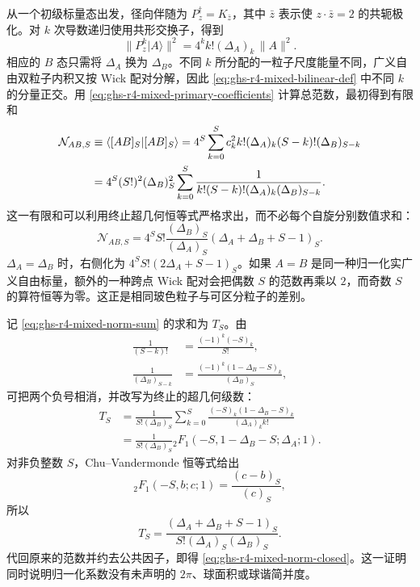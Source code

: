 从一个初级标量态出发，径向伴随为 $P_z^\dagger=K_{\bar z}$，其中 $\bar z$ 表示使 $z\cdot\bar z=2$ 的共轭极化。对 $k$ 次导数递归使用共形交换子，得到
\begin{equation}\label{eq:ghs-r4-oneparticle-highest-norm}
 \|P_z^k|A\rangle\|^2
 =4^k k!(\Delta_A)_k\,\|A\|^2.
\end{equation}
相应的 $B$ 态只需将 $\Delta_A$ 换为 $\Delta_B$。不同 $k$ 所分配的一粒子尺度能量不同，广义自由双粒子内积又按 Wick 配对分解，因此 \cref{eq:ghs-r4-mixed-bilinear-def} 中不同 $k$ 的分量正交。用 \cref{eq:ghs-r4-mixed-primary-coefficients} 计算总范数，最初得到有限和
\begin{align}\label{eq:ghs-r4-mixed-norm-sum}
 \mathcal N_{AB,S}&\equiv\langle[AB]_S|[AB]_S\rangle
 =4^S\sum_{k=0}^S c_k^2
 k!(\Delta_A)_k(S-k)!(\Delta_B)_{S-k}\\
 &=4^S(S!)^2(\Delta_B)_S^2
 \sum_{k=0}^S\frac{1}{k!(S-k)!(\Delta_A)_k(\Delta_B)_{S-k}}.
 \notag
\end{align}
这一有限和可以利用终止超几何恒等式严格求出，而不必每个自旋分别数值求和：
\begin{equation}\label{eq:ghs-r4-mixed-norm-closed}
 \mathcal N_{AB,S}=4^S S!\frac{(\Delta_B)_S}{(\Delta_A)_S}
 (\Delta_A+\Delta_B+S-1)_S.
\end{equation}
$\Delta_A=\Delta_B$ 时，右侧化为 $4^S S!(2\Delta_A+S-1)_S$。如果 $A=B$ 是同一种归一化实广义自由标量，额外的一种跨点 Wick 配对会把偶数 $S$ 的范数再乘以 $2$，而奇数 $S$ 的算符恒等为零。这正是相同玻色粒子与可区分粒子的差别。


记 \cref{eq:ghs-r4-mixed-norm-sum} 的求和为 $T_S$。由
\begin{align*}
 \frac{1}{(S-k)!}&=\frac{(-1)^k(-S)_k}{S!},\\
 \frac{1}{(\Delta_B)_{S-k}}
 &=\frac{(-1)^k(1-\Delta_B-S)_k}{(\Delta_B)_S},
\end{align*}
可把两个负号相消，并改写为终止的超几何级数：
\begin{align*}
 T_S&=\frac1{S!(\Delta_B)_S}
 \sum_{k=0}^S\frac{(-S)_k(1-\Delta_B-S)_k}{(\Delta_A)_k k!}\\
 &=\frac1{S!(\Delta_B)_S}
 {}_2F_1(-S,1-\Delta_B-S;\Delta_A;1).
\end{align*}
对非负整数 $S$，Chu--Vandermonde 恒等式给出
\begin{equation*}
 {}_2F_1(-S,b;c;1)=\frac{(c-b)_S}{(c)_S},
\end{equation*}
所以
\begin{equation*}
 T_S=\frac{(\Delta_A+\Delta_B+S-1)_S}
 {S!(\Delta_A)_S(\Delta_B)_S}.
\end{equation*}
代回原来的范数并约去公共因子，即得 \cref{eq:ghs-r4-mixed-norm-closed}。这一证明同时说明归一化系数没有未声明的 $2\pi$、球面积或球谐简并度。


